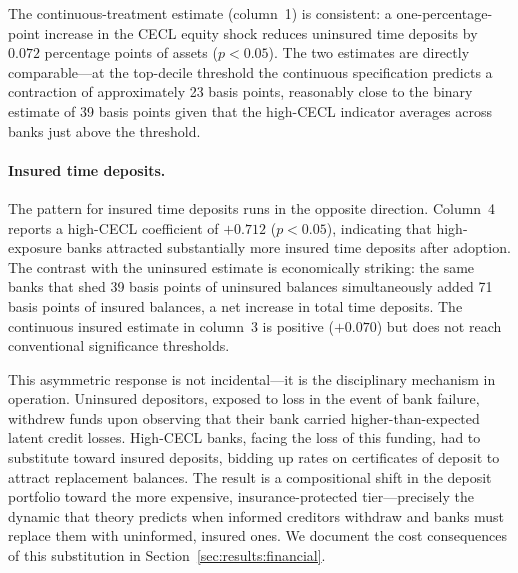 The continuous-treatment estimate (column~1) is consistent: a one-percentage-point
increase in the CECL equity shock reduces uninsured time deposits by $0.072$
percentage points of assets ($p < 0.05$). The two estimates are directly
comparable—at the top-decile threshold the continuous specification predicts a
contraction of approximately 23 basis points, reasonably close to the binary
estimate of 39 basis points given that the high-CECL indicator averages across
banks just above the threshold.

\paragraph{Insured time deposits.}
The pattern for insured time deposits runs in the opposite direction. Column~4
reports a high-CECL coefficient of $+0.712$ ($p < 0.05$), indicating that
high-exposure banks attracted substantially more insured time deposits after
adoption. The contrast with the uninsured estimate is economically striking: the
same banks that shed 39 basis points of uninsured balances simultaneously added
71 basis points of insured balances, a net increase in total time deposits. The
continuous insured estimate in column~3 is positive ($+0.070$) but does not
reach conventional significance thresholds.

This asymmetric response is not incidental—it is the disciplinary mechanism in
operation. Uninsured depositors, exposed to loss in the event of bank failure,
withdrew funds upon observing that their bank carried higher-than-expected latent
credit losses. High-CECL banks, facing the loss of this funding, had to
substitute toward insured deposits, bidding up rates on certificates of deposit
to attract replacement balances. The result is a compositional shift in the
deposit portfolio toward the more expensive, insurance-protected tier—precisely
the dynamic that theory predicts when informed creditors withdraw and banks must
replace them with uninformed, insured ones. We document the cost consequences
of this substitution in Section~\ref{sec:results:financial}.

